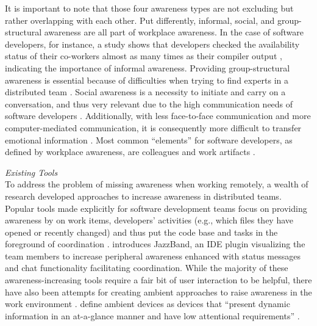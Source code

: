 \noindent It is important to note that those four awareness types are not excluding but rather overlapping with each other. Put differently, informal, social, and group-structural awareness are all part of workplace awareness. In the case of software developers, for instance, a study shows that developers checked the availability status of their co-workers almost as many times as their compiler output \autocite{ko2007information}, indicating the importance of informal awareness. Providing group-structural awareness is essential because of difficulties when trying to find experts in a distributed team \autocite{herbsleb2003empirical}. Social awareness is a necessity to initiate and carry on a conversation, and thus very relevant due to the high communication needs of software developers \autocite{perry1994people}. Additionally, with less face-to-face communication and more computer-mediated communication, it is consequently more difficult to transfer emotional information \autocite{rivera1996effects}. Most common \enquote{elements} for software developers, as defined by workplace awareness, are colleagues and work artifacts \autocite{ko2007information}.

\medskip\noindent\textit{Existing Tools}\\
To address the problem of missing awareness when working remotely, a wealth of research developed approaches to increase awareness in distributed teams. Popular tools made explicitly for software development teams focus on providing awareness by on work items, developers’ activities (e.g., which files they have opened or recently changed) and thus put the code base and tasks in the foreground of coordination \autocite{biehl2007fastdash, jakobsen2009wipdash, eick1992seesoft, deline2005easing}. \textcite{cheng2003jazzing} introduces JazzBand, an IDE plugin visualizing the team members to increase peripheral awareness enhanced with status messages and chat functionality facilitating coordination. While the majority of these awareness-increasing tools require a fair bit of user interaction to be helpful, there have also been attempts for creating ambient approaches to raise awareness in the work environment \autocite{morrison2020facilitating, otjacques2006ambient, downs2012ambient, alavi2012ambient, rocker2004using}. \citeauthor{downs2012ambient} define ambient devices as devices that \enquote{present dynamic information in an at-a-glance manner and have low attentional requirements} \autocite[p.~508]{downs2012ambient}.

